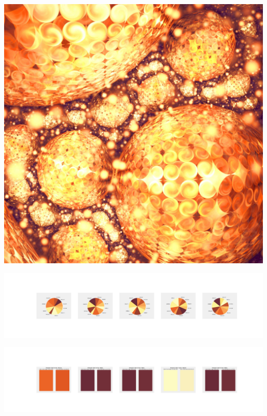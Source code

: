 \documentclass[11pt]{article}
\begin{document}
\begin{landscape}
    \begin{center}
    \includegraphics[width=\textwidth]{./nbimg/file (299).jpg}
    \end{center}

    \begin{center}
    \includegraphics[width=250mm]{./nbimg/pie-221.jpg}
    \end{center}

    \begin{center}
    \includegraphics[width=250mm]{./nbimg/peak-221.jpg}
    \end{center}
    


\end{landscape}
\end{document}
